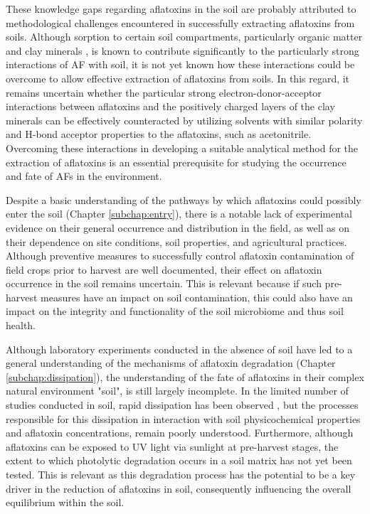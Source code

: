 These knowledge gaps regarding aflatoxins in the soil are probably attributed to methodological challenges encountered in successfully extracting aflatoxins from soils. Although sorption to certain soil compartments, particularly organic matter \citep{schenzel2012experimentally} and clay minerals \citep{kang2016understanding}, is known to contribute significantly to the particularly strong interactions of AF with soil, it is not yet known how these interactions could be overcome to allow effective extraction of aflatoxins from soils. In this regard, it remains uncertain whether the particular strong electron-donor-acceptor interactions between aflatoxins and the positively charged layers of the clay minerals can be effectively counteracted by utilizing solvents with similar polarity and H-bond acceptor properties to the aflatoxins, such as acetonitrile. Overcoming these interactions in developing a suitable analytical method for the extraction of aflatoxins is an essential prerequisite for studying the occurrence and fate of AFs in the environment.


Despite a basic understanding of the pathways by which aflatoxins could possibly enter the soil (Chapter \ref{subchap:entry}), there is a notable lack of experimental evidence on their general occurrence and distribution in the field, as well as on their dependence on site conditions, soil properties, and agricultural practices. Although preventive measures to successfully control aflatoxin contamination of field crops prior to harvest are well documented, their effect on aflatoxin occurrence in the soil remains uncertain. This is relevant because if such pre-harvest measures have an impact on soil contamination, this could also have an impact on the integrity and functionality of the soil microbiome and thus soil health.


Although laboratory experiments conducted in the absence of soil have led to a general understanding of the mechanisms of aflatoxin degradation (Chapter \ref{subchap:dissipation}), the understanding of the fate of aflatoxins in their complex natural environment "soil", is still largely incomplete. In the limited number of studies conducted in soil, rapid dissipation has been observed \citep{accinelli2008aspergillus, angle1980decomposition, angle1986aflatoxin}, but the processes responsible for this dissipation in interaction with soil physicochemical properties and aflatoxin concentrations, remain poorly understood. Furthermore, although aflatoxins can be exposed to UV light via sunlight at pre-harvest stages, the extent to which photolytic degradation occurs in a soil matrix has not yet been tested. This is relevant as this degradation process has the potential to be a key driver in the reduction of aflatoxins in soil, consequently influencing the overall equilibrium within the soil.


